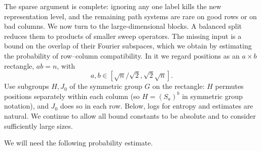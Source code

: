 \label{tra:first-interactions:balanced-grid-setup}
The sparse argument is complete: ignoring any one label kills the
new representation level, and the remaining path systems are rare on
good rows or on bad columns. We now turn to the large-dimensional
blocks. A balanced split reduces them to products of smaller sweep
operators. The missing input is a bound on the overlap of their
Fourier subspaces, which we obtain by estimating the probability of
row--column compatibility. In it we regard positions as an \(a\times b\) rectangle, \(a b=n\), with
\[
                       a,b\in[\sqrt n/\sqrt 2,\sqrt 2\sqrt n].
\]
Use subgroups \(H,J_0\) of the symmetric group \(G\) on the rectangle: \(H\) permutes positions separately within each column (so \(H=(S_a)^b\) in symmetric group notation), and \(J_0\) does so in each row. Below, logs for entropy and estimates are natural. We continue to allow all bound constants to be absolute and to consider sufficiently large sizes.

We will need the following probability estimate.

